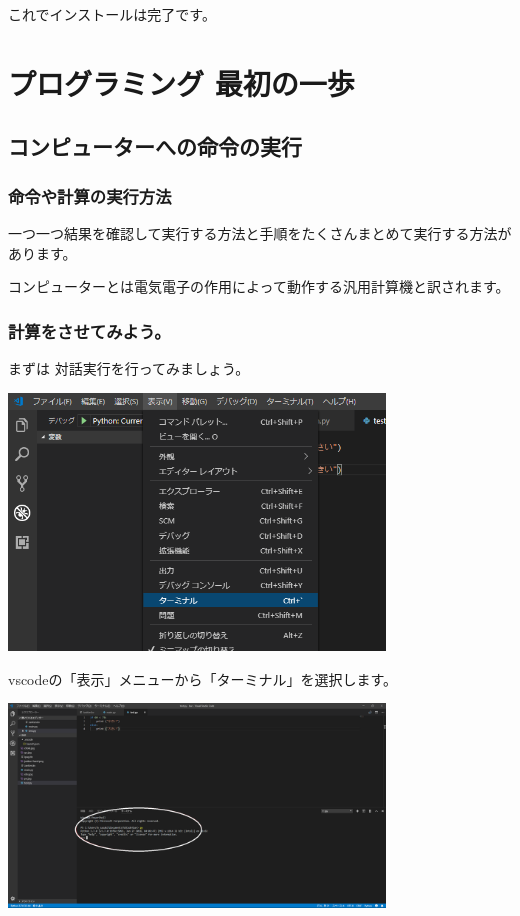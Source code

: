 \documentclass[11pt,a4paper,dvipdfmx,titlepage]{jsreport}
\begin{document}
これでインストールは完了です。




\chapter{プログラミング 最初の一歩}
\setcounter{section}{0}

\section{コンピューターへの命令の実行}
\subsection{命令や計算の実行方法}
 一つ一つ結果を確認して実行する方法と手順をたくさんまとめて実行する方法があります。

 コンピューターとは電気電子の作用によって動作する汎用計算機と訳されます。

\subsection{計算をさせてみよう。}

 まずは {\gt 対話実行}を行ってみましょう。

\includegraphics[width=10cm]{images/image1.png}

vscodeの「表示」メニューから「ターミナル」を選択します。

\includegraphics[width=10cm]{images/image7.png}
\end{document}
